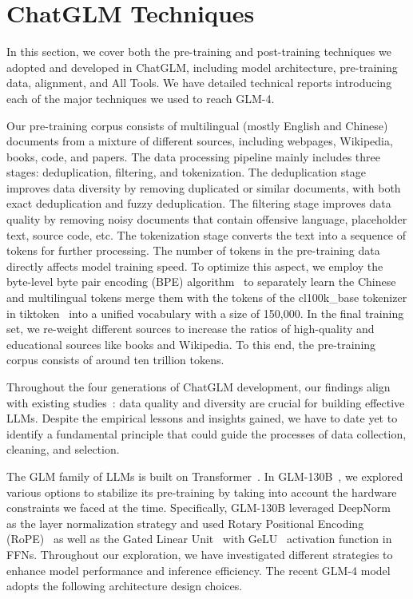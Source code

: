 


\section{ChatGLM Techniques}

In this section, we cover both the pre-training and post-training techniques we adopted and developed in ChatGLM, including model architecture, pre-training data, alignment, and All Tools. 
We have detailed technical reports introducing each of the major techniques we used to reach GLM-4. 
 

Our pre-training corpus consists of multilingual (mostly English and Chinese) documents from a mixture of different sources, including webpages, Wikipedia, books, code, and papers. 
The data processing pipeline mainly includes three stages: deduplication, filtering, and tokenization. 
The deduplication stage improves data diversity by removing duplicated or similar documents, with both exact deduplication and fuzzy deduplication. 
The filtering stage improves data quality by removing noisy documents that contain offensive language, placeholder text, source code, etc. 
The tokenization stage converts the text into a sequence of tokens for further processing. 
The number of tokens in the pre-training data directly affects model training speed. 
To optimize this aspect, we employ the byte-level byte pair encoding (BPE) algorithm~\cite{sennrich2016neural} to separately learn the Chinese and multilingual tokens merge them with the tokens of the cl100k\_base tokenizer in tiktoken~\cite{tiktoken} into a unified vocabulary with a size of 150,000. 
In the final training set, we re-weight different sources to increase the ratios of high-quality and educational sources like books and Wikipedia. To this end, the pre-training corpus consists of around ten trillion tokens.




Throughout the four generations of ChatGLM development, our findings align with existing studies~\cite{zhou2023lima}: data quality and diversity are crucial for building effective LLMs. 
Despite the empirical lessons and insights gained, we have to date yet to identify a fundamental principle that could guide the processes of data collection, cleaning, and selection.



The GLM family of LLMs is built on Transformer~\cite{vaswani2023attention}. 
In GLM-130B~\cite{zeng2022glm}, we explored various options to stabilize its pre-training by taking into account the hardware constraints we faced at the time. 
Specifically, GLM-130B leveraged DeepNorm~\cite{wang2022deepnet} as the layer normalization strategy and used Rotary Positional Encoding (RoPE)~\cite{su2021roformer} as well as the Gated Linear Unit~\cite{shazeer2020glu} with GeLU~\cite{hendrycks2016gaussian} activation function in FFNs. 
Throughout our exploration, we have investigated different strategies to enhance model performance and inference efficiency.  
The recent GLM-4 model adopts the following architecture design choices. 

